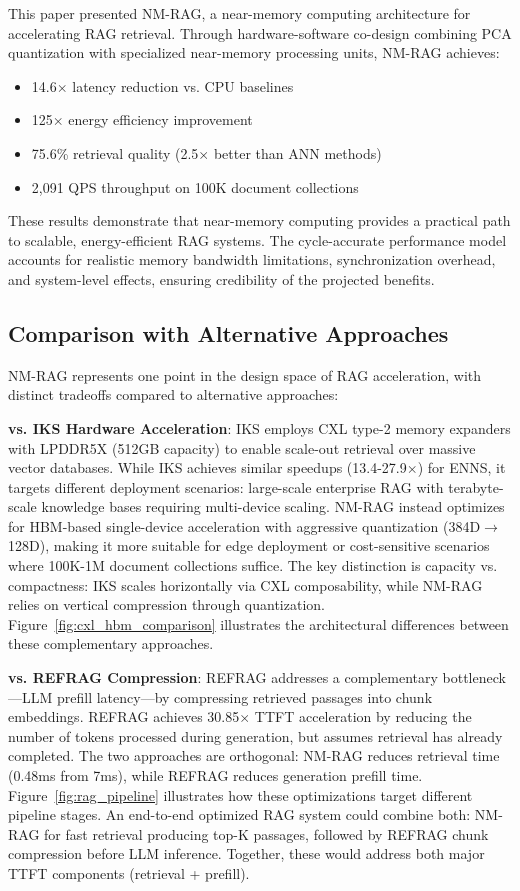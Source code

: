 \documentclass[conference]{IEEEtran}
\begin{document}
This paper presented NM-RAG, a near-memory computing architecture for accelerating RAG retrieval. Through hardware-software co-design combining PCA quantization with specialized near-memory processing units, NM-RAG achieves:

\begin{itemize}
    \item 14.6$\times$ latency reduction vs. CPU baselines
    \item 125$\times$ energy efficiency improvement
    \item 75.6\% retrieval quality (2.5$\times$ better than ANN methods)
    \item 2,091 QPS throughput on 100K document collections
\end{itemize}

These results demonstrate that near-memory computing provides a practical path to scalable, energy-efficient RAG systems. The cycle-accurate performance model accounts for realistic memory bandwidth limitations, synchronization overhead, and system-level effects, ensuring credibility of the projected benefits.

\subsection{Comparison with Alternative Approaches}

NM-RAG represents one point in the design space of RAG acceleration, with distinct tradeoffs compared to alternative approaches:

\textbf{vs. IKS Hardware Acceleration}: IKS employs CXL type-2 memory expanders with LPDDR5X (512GB capacity) to enable scale-out retrieval over massive vector databases. While IKS achieves similar speedups (13.4-27.9$\times$) for ENNS, it targets different deployment scenarios: large-scale enterprise RAG with terabyte-scale knowledge bases requiring multi-device scaling. NM-RAG instead optimizes for HBM-based single-device acceleration with aggressive quantization (384D$\rightarrow$128D), making it more suitable for edge deployment or cost-sensitive scenarios where 100K-1M document collections suffice. The key distinction is capacity vs. compactness: IKS scales horizontally via CXL composability, while NM-RAG relies on vertical compression through quantization. Figure~\ref{fig:cxl_hbm_comparison} illustrates the architectural differences between these complementary approaches.

\textbf{vs. REFRAG Compression}: REFRAG addresses a complementary bottleneck—LLM prefill latency—by compressing retrieved passages into chunk embeddings. REFRAG achieves 30.85$\times$ TTFT acceleration by reducing the number of tokens processed during generation, but assumes retrieval has already completed. The two approaches are orthogonal: NM-RAG reduces retrieval time (0.48ms from 7ms), while REFRAG reduces generation prefill time. Figure~\ref{fig:rag_pipeline} illustrates how these optimizations target different pipeline stages. An end-to-end optimized RAG system could combine both: NM-RAG for fast retrieval producing top-K passages, followed by REFRAG chunk compression before LLM inference. Together, these would address both major TTFT components (retrieval + prefill).
\end{document}
